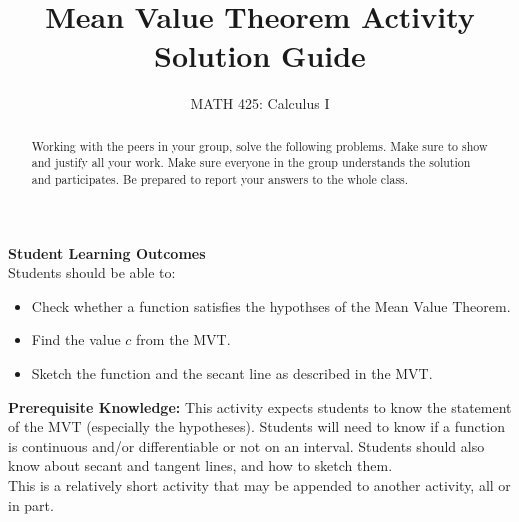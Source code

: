 \documentclass{ximera}
\title{Mean Value Theorem Activity Solution Guide}
\author{MATH 425: Calculus I}
\begin{document}
\begin{abstract}
   Working with the peers in your group, solve the following problems. Make sure to show and justify all your work. Make sure everyone in the group understands the solution and participates. Be prepared to report your answers to the whole class. 
\end{abstract}
\maketitle

\textbf{Student Learning Outcomes}\\
Students should be able to: 
    \begin{itemize}
        \item Check whether a function satisfies the hypothses of the Mean Value Theorem.
        \item Find the value $c$ from the MVT.
        \item Sketch the function and the secant line as described in the MVT.
    \end{itemize}

\textbf{Prerequisite Knowledge:} This activity expects students to know the statement of the MVT (especially the hypotheses).  Students will need to know if a function is continuous and/or differentiable or not on an interval.  Students should also know about secant and tangent lines, and how to sketch them.  \\

This is a relatively short activity that may be appended to another activity, all or in part.
\end{document}
